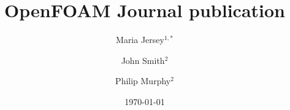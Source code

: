 \documentclass[e-only,10pt,reqno]{ofj}
\newcommand{\OF}[0]{OpenFOAM\textsuperscript{\textregistered}\xspace}
\begin{document}


\title[\OF Journal publication]{\OF Journal publication}

\ifdefined\review
  \author{}
  \address{}
  \email{}
\else



\author[M. Jersey]{Maria Jersey$^{1,*}$}
\address{$^1$Address1}

\author[J. Smith]{John Smith$^2$}
\address{$^2$Address2} %

\author[P. Murphy]{Philip Murphy$^2$} %
\fi






\date{\today}

\dedicatory{}


\maketitle

\ifdefined\review
  \linenumbers
\else
\fi




\end{document}
